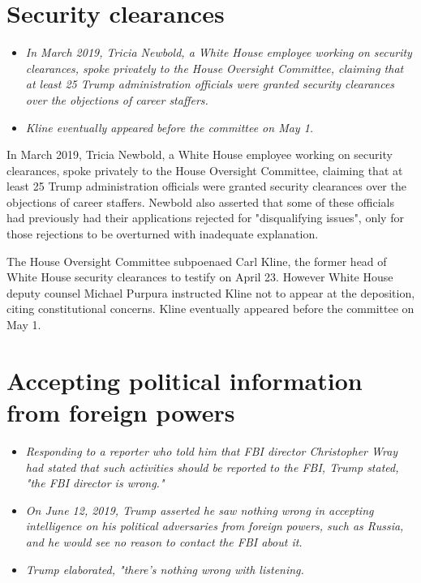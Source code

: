\section{Security clearances}\label{security-clearances}

\begin{itemize}
\item
  \emph{In March 2019, Tricia Newbold, a White House employee working on
  security clearances, spoke privately to the House Oversight Committee,
  claiming that at least 25 Trump administration officials were granted
  security clearances over the objections of career staffers.}
\item
  \emph{Kline eventually appeared before the committee on May 1.}
\end{itemize}

In March 2019, Tricia Newbold, a White House employee working on
security clearances, spoke privately to the House Oversight Committee,
claiming that at least 25 Trump administration officials were granted
security clearances over the objections of career staffers. Newbold also
asserted that some of these officials had previously had their
applications rejected for "disqualifying issues", only for those
rejections to be overturned with inadequate explanation.

The House Oversight Committee subpoenaed Carl Kline, the former head of
White House security clearances to testify on April 23. However White
House deputy counsel Michael Purpura instructed Kline not to appear at
the deposition, citing constitutional concerns. Kline eventually
appeared before the committee on May 1.

\section{Accepting political information from foreign
powers}\label{accepting-political-information-from-foreign-powers}

\begin{itemize}
\item
  \emph{Responding to a reporter who told him that FBI director
  Christopher Wray had stated that such activities should be reported to
  the FBI, Trump stated, "the FBI director is wrong."}
\item
  \emph{On June 12, 2019, Trump asserted he saw nothing wrong in
  accepting intelligence on his political adversaries from foreign
  powers, such as Russia, and he would see no reason to contact the FBI
  about it.}
\item
  \emph{Trump elaborated, "there's nothing wrong with listening.}
\end{itemize}


